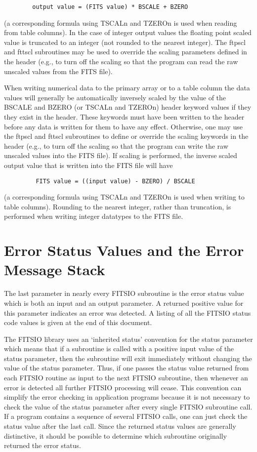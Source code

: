 \documentclass[11pt]{book}
\begin{document}
\begin{verbatim}
        output value = (FITS value) * BSCALE + BZERO
\end{verbatim}
(a corresponding formula using TSCALn and TZEROn is used when reading
from table columns).  In the case of integer output values the floating
point scaled value is truncated to an integer (not rounded to the
nearest integer).  The ftpscl and fttscl subroutines may be used to
override the scaling parameters defined in the header (e.g., to turn
off the scaling so that the program can read the raw unscaled values
from the FITS file).

When writing numerical data to the primary array or to a table
column the data values will generally be automatically inversely scaled
by the value of the BSCALE and BZERO (or TSCALn and TZEROn) header
keyword values if they they exist in the header.  These keywords must
have been written to the header before any data is written for them to
have any effect.  Otherwise, one may use the ftpscl and fttscl
subroutines to define or override the scaling keywords in the header
(e.g., to turn off the scaling so that the program can write the raw
unscaled values into the FITS file). If scaling is performed, the
inverse scaled output value that is written into the FITS file will
have

\begin{verbatim}
         FITS value = ((input value) - BZERO) / BSCALE
\end{verbatim}
(a corresponding formula using TSCALn and TZEROn is used when
writing to table columns).  Rounding to the nearest integer, rather
than truncation, is performed when writing integer datatypes to the
FITS file.


\section{Error Status Values and the Error Message Stack}

The last parameter in nearly every FITSIO subroutine is the error
status value which is both an input and an output parameter.  A
returned positive value for this parameter indicates an error was
detected.  A listing of all the FITSIO status code values is given at
the end of this document.

The FITSIO library uses an `inherited status' convention for the status
parameter which means that if a subroutine is called with a positive
input value of the status parameter, then the subroutine will exit
immediately without changing the value of the status parameter.  Thus,
if one passes the status value returned from each FITSIO routine as
input to the next FITSIO subroutine, then whenever an error is detected
all further FITSIO processing will cease.  This convention can simplify
the error checking in application programs because it is not necessary
to check the value of the status parameter after every single FITSIO
subroutine call.  If a program contains a sequence of several FITSIO
calls, one can just check the status value after the last call.  Since
the returned status values are generally distinctive, it should be
possible to determine which subroutine originally returned the error
status.
\end{document}
